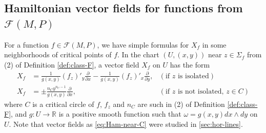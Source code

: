 \documentclass[10pt,reqno]{amsart}
\newcommand{\bbR}{\mathbb{R}}
\newcommand{\F}{\mathcal{F}(M,P)}
\newcommand{\Crit}{\Sigma_f}
\begin{document}
\subsection{Hamiltonian vector fields for functions from $\F$}\label{ssec:ham-function-F}
For a function  $f\in\F$, we  have simple formulas for $X_f$ in some neighborhoods of critical points of $f$. In the chart $(U, (x,y))$ near $z\in\Crit$
from (2) of  Definition \ref{def:class-F}, a vector field 
$X_f$ on $U$ has the form
\begin{align}
	X_f &= \frac{1}{g(x,y)}  (f_z)'_y\frac{\partial}{\partial x} - \frac{1}{g(x,y)} (f_z)'_x\frac{\partial}{\partial y}, &(\text{if $z$ is isolated})\label{eq:ham-vf-near-iso}   \\
	 X_f &= \pm\frac{n_Cy^{n_C-1}}{{g}(x,y)}\frac{\partial}{\partial x},& (\text{if $z$ is not isolated, $z\in C$})\label{eq:Ham-near-C}
\end{align}
where $C$ is a critical circle of $f$,
$f_z$ and $n_C$ are such in (2) of  Definition \ref{def:class-F}, and $g:U\to \bbR$ is a positive smooth function such that $\omega = g(x,y)dx\wedge dy$ on $U$. Note that vector fields as \eqref{eq:Ham-near-C} were studied in \textsection\ref{sec:hor-lines}. 
 
 
\end{document}
